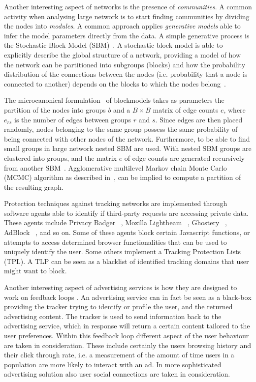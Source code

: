 Another interesting aspect of networks is the presence of \emph{communities}. A common activity when analysing large network is to start finding communities by dividing the nodes into \emph{modules}. A common approach applies \emph{generative models} able to infer the model parameters directly from the data. A simple generative process is the Stochastic Block Model (SBM)~\cite{holland1983stochastic}. A stochastic block model is able to explicitly describe the global structure of a network, providing a model of how the network can be partitioned into subgroups (blocks) and how the probability distribution of the connections between the nodes (i.e. probability that a node is connected to another) depends on the blocks to which the nodes belong~\cite{faust1992blockmodels}.

The microcanonical formulation~\cite{peixoto2012entropy} of blockmodels takes as parameters the partition of the nodes into groups $b$ and a $B \times B$ matrix of edge counts $e$, where $e_{rs}$ is the number of edges between groups $r$ and $s$. Since edges are then placed randomly, nodes belonging to the same group possess the same probability of being connected with other nodes of the network. Furthermore, to be able to find small groups in large network nested SBM are used. With nested SBM groups are clustered into groups, and the matrix $e$ of edge counts are generated recursively from another SBM~\cite{peixoto2014hierarchical}. Agglomerative multilevel Markov chain Monte Carlo (MCMC) algorithm as described in~\cite{peixoto2014efficient}, can be implied to compute a partition of the resulting graph.

Protection techniques against tracking networks are implemented through software agents able to identify if third-party requests are accessing private data. These agents include Privacy Badger ~\cite{privacy-badger}, Mozilla Lightbeam ~\cite{lightbeam}, Ghostery ~\cite{ghostery}, AdBlock ~\cite{adblock}, and so on. Some of these agents block certain Javascript functions, or attempts to access determined browser functionalities that can be used to uniquely identify the user. Some others implement a Tracking Protection Lists (TPL). A TLP can be seen as a blacklist of identified tracking domains that user might want to block. 

Another interesting aspect of advertising services is how they are designed to work on feedback loops \cite{degeling2016your}. An advertising service can in fact be seen as a black-box providing the tracker trying to identify or profile the user, and the returned advertising content. The tracker is used to send information back to the advertising service, which in response will return a certain content tailored to the user preferences. Within this feedback loop different aspect of the user behaviour are taken in consideration. These include certainly the users browsing history and their click through rate, i.e. a measurement of the amount of time users in a population are more likely to interact with an ad. In more sophisticated advertising solution also user social connections are taken in consideration.

